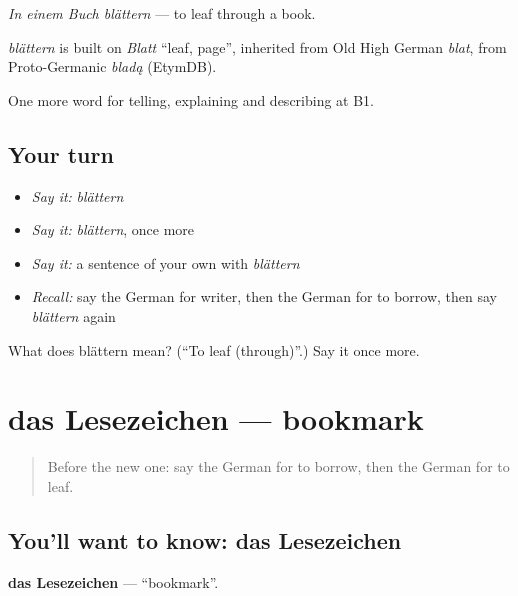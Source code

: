 \emph{In einem Buch blättern} — to leaf through a book.

\begin{cousinweb}
\emph{blättern} is built on \emph{Blatt} \textquotedblleft{}leaf, page\textquotedblright{}, inherited from Old High German \emph{blat}, from Proto-Germanic \emph{bladą} (EtymDB).
\end{cousinweb}

\begin{grammarlens}[title={What you've built}]
One more word for telling, explaining and describing at B1.
\end{grammarlens}

\subsection*{Your turn}
\begin{itemize}
\raggedright
  \item \emph{Say it:} \emph{blättern}
  \item \emph{Say it:} \emph{blättern}, once more
  \item \emph{Say it:} a sentence of your own with \emph{blättern}
  \item \emph{Recall:} say the German for writer, then the German for to borrow, then say \emph{blättern} again
\end{itemize}

\begin{tcolorbox}[breakable,colback=teal!4,colframe=teal!35!black,title={Before you move on}]
What does blättern mean? (\textquotedblleft{}To leaf (through)\textquotedblright{}.) Say it once more.
\end{tcolorbox}
\section[das Lesezeichen]{das Lesezeichen — bookmark}

\label{lesson:GE-C522-lesezeichen}



\begin{quote}
Before the new one: say the German for to borrow, then the German for to leaf.
\end{quote}

\subsection*{You'll want to know: das Lesezeichen}
\textbf{das Lesezeichen} — \textquotedblleft{}bookmark\textquotedblright{}.

